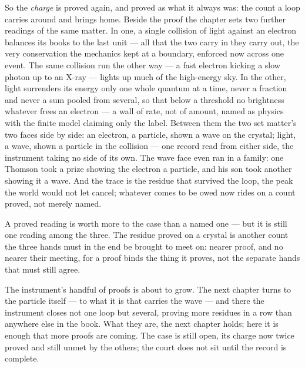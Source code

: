 So the \emph{charge} is proved again, and proved as what it always was: the count a loop carries around and
brings home. Beside the proof the chapter sets two further readings of the same matter. In one, a single
collision of light against an electron balances its books to the last unit --- all that the two carry in they
carry out, the very conservation the mechanics kept at a boundary, enforced now across one event. The same
collision run the other way --- a fast electron kicking a slow photon up to an X-ray --- lights up much of the
high-energy sky. In the other, light surrenders its energy only one whole quantum at a time, never a fraction
and never a sum pooled from several, so that below a threshold no brightness whatever frees an electron --- a
wall of rate, not of amount, named as physics with the finite model claiming only the label. Between them the
two set matter's two faces side by side: an electron, a particle, shown a wave on the crystal; light, a wave,
shown a particle in the collision --- one record read from either side, the instrument taking no side of its
own. The wave face even ran in a family: one Thomson took a prize showing the electron a particle, and his son
took another showing it a wave. And the trace is the residue that survived the loop, the peak the world would
not let cancel; whatever comes to be owed now rides on a count proved, not merely named.

A proved reading is worth more to the case than a named one --- but it is still one reading among the three. The
residue proved on a crystal is another count the three hands must in the end be brought to meet on: nearer
proof, and no nearer their meeting, for a proof binds the thing it proves, not the separate hands that must
still agree.

The instrument's handful of proofs is about to grow. The next chapter turns to the particle itself --- to what
it is that carries the wave --- and there the instrument closes not one loop but several, proving more residues
in a row than anywhere else in the book. What they are, the next chapter holds; here it is enough that more
proofs are coming. The case is still open, its charge now twice proved and still unmet by the others; the court
does not sit until the record is complete.

